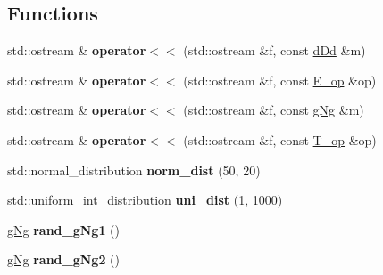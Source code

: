 \subsection*{Functions}
\begin{DoxyCompactItemize}
\item 
\mbox{\label{namespaceetvo_i_i_afbd4fcd3a8ac4d8ca62fe579e0240110}} 
std\+::ostream \& {\bfseries operator$<$$<$} (std\+::ostream \&f, const \mbox{\hyperlink{classetvo_i_i_1_1d_dd}{d\+Dd}} \&m)
\item 
\mbox{\label{namespaceetvo_i_i_ae0b1f4a2d2114b52ace9e09e98fb46bd}} 
std\+::ostream \& {\bfseries operator$<$$<$} (std\+::ostream \&f, const \mbox{\hyperlink{classetvo_i_i_1_1_e__op}{E\+\_\+op}} \&op)
\item 
\mbox{\label{namespaceetvo_i_i_aa5a14ab4650cb30d0c854b45342a3bfb}} 
std\+::ostream \& {\bfseries operator$<$$<$} (std\+::ostream \&f, const \mbox{\hyperlink{classetvo_i_i_1_1g_ng}{g\+Ng}} \&m)
\item 
\mbox{\label{namespaceetvo_i_i_a995225d369f46520cb09e3cf3cf30b3f}} 
std\+::ostream \& {\bfseries operator$<$$<$} (std\+::ostream \&f, const \mbox{\hyperlink{classetvo_i_i_1_1_t__op}{T\+\_\+op}} \&op)
\item 
\mbox{\label{namespaceetvo_i_i_a27a7ebfe3fdfe42a5a029c1118b6aa9e}} 
std\+::normal\+\_\+distribution {\bfseries norm\+\_\+dist} (50, 20)
\item 
\mbox{\label{namespaceetvo_i_i_ab553670981730916fd84c2b3320d1920}} 
std\+::uniform\+\_\+int\+\_\+distribution {\bfseries uni\+\_\+dist} (1, 1000)
\item 
\mbox{\label{namespaceetvo_i_i_aad9ff411d39ed3405d113d78490e3e40}} 
\mbox{\hyperlink{classetvo_i_i_1_1g_ng}{g\+Ng}} {\bfseries rand\+\_\+g\+Ng1} ()
\item 
\mbox{\label{namespaceetvo_i_i_a3d2f9ff649a0bb14415f02b21ce14e62}} 
\mbox{\hyperlink{classetvo_i_i_1_1g_ng}{g\+Ng}} {\bfseries rand\+\_\+g\+Ng2} ()
\item 
\mbox{\label{namespaceetvo_i_i_ad5195b8b5ade5a29eeb422eeacacc8a1}} 

\end{DoxyCompactItemize}
